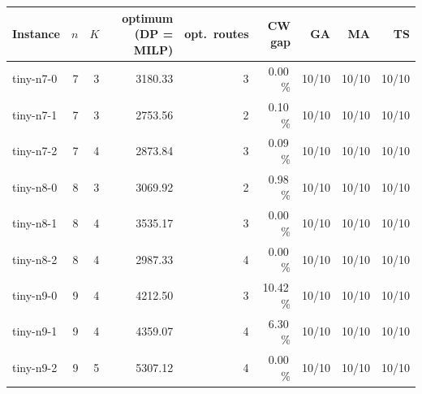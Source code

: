 \begin{tabular}{@{}l r r r r r r r r@{}}
\toprule
Instance & $n$ & $K$ & optimum (DP = MILP) & opt.\ routes & CW gap & GA & MA & TS \\
\midrule
tiny-n7-0 & 7 & 3 & 3180.33 & 3 & 0.00\,\% & 10/10 & 10/10 & 10/10 \\
tiny-n7-1 & 7 & 3 & 2753.56 & 2 & 0.10\,\% & 10/10 & 10/10 & 10/10 \\
tiny-n7-2 & 7 & 4 & 2873.84 & 3 & 0.09\,\% & 10/10 & 10/10 & 10/10 \\
tiny-n8-0 & 8 & 3 & 3069.92 & 2 & 0.98\,\% & 10/10 & 10/10 & 10/10 \\
tiny-n8-1 & 8 & 4 & 3535.17 & 3 & 0.00\,\% & 10/10 & 10/10 & 10/10 \\
tiny-n8-2 & 8 & 4 & 2987.33 & 4 & 0.00\,\% & 10/10 & 10/10 & 10/10 \\
tiny-n9-0 & 9 & 4 & 4212.50 & 3 & 10.42\,\% & 10/10 & 10/10 & 10/10 \\
tiny-n9-1 & 9 & 4 & 4359.07 & 4 & 6.30\,\% & 10/10 & 10/10 & 10/10 \\
tiny-n9-2 & 9 & 5 & 5307.12 & 4 & 0.00\,\% & 10/10 & 10/10 & 10/10 \\
\bottomrule
\end{tabular}
